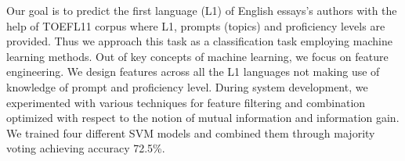 Our goal is to predict the first language (L1) of English essays's authors with the help of TOEFL11 corpus where L1, prompts (topics) and proficiency levels
 are provided. Thus we approach this task as a classification task employing
 machine learning methods.  Out of key concepts of machine learning, we focus on
 feature engineering. We design features across all the L1 languages not making
 use of knowledge of prompt and proficiency level. During system development, we
 experimented with various techniques for feature filtering and combination
 optimized with respect to the notion of mutual information and information
 gain. We trained four different SVM models and combined them through majority
 voting achieving accuracy 72.5\%.


